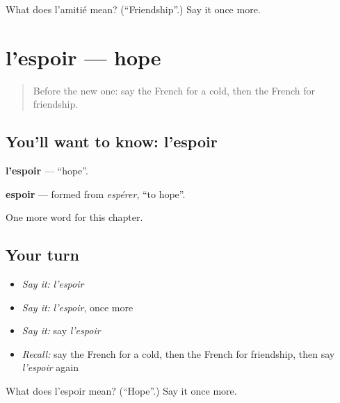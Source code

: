 \begin{tcolorbox}[breakable,colback=teal!4,colframe=teal!35!black,title={Before you move on}]
What does l'amitié mean? (\textquotedblleft{}Friendship\textquotedblright{}.) Say it once more.
\end{tcolorbox}
\section[l'espoir]{l'espoir — hope}

\label{lesson:FR-C186-espoir}



\begin{quote}
Before the new one: say the French for a cold, then the French for friendship.
\end{quote}

\subsection*{You'll want to know: l'espoir}
\textbf{l'espoir} — \textquotedblleft{}hope\textquotedblright{}.

\begin{cousinweb}
\textbf{espoir} — formed from \emph{espérer}, \textquotedblleft{}to hope\textquotedblright{}.
\end{cousinweb}

\begin{grammarlens}[title={What you've built}]
One more word for this chapter.
\end{grammarlens}

\subsection*{Your turn}
\begin{itemize}
\raggedright
  \item \emph{Say it:} \emph{l'espoir}
  \item \emph{Say it:} \emph{l'espoir}, once more
  \item \emph{Say it:} say \emph{l'espoir}
  \item \emph{Recall:} say the French for a cold, then the French for friendship, then say \emph{l'espoir} again
\end{itemize}

\begin{tcolorbox}[breakable,colback=teal!4,colframe=teal!35!black,title={Before you move on}]
What does l'espoir mean? (\textquotedblleft{}Hope\textquotedblright{}.) Say it once more.
\end{tcolorbox}
